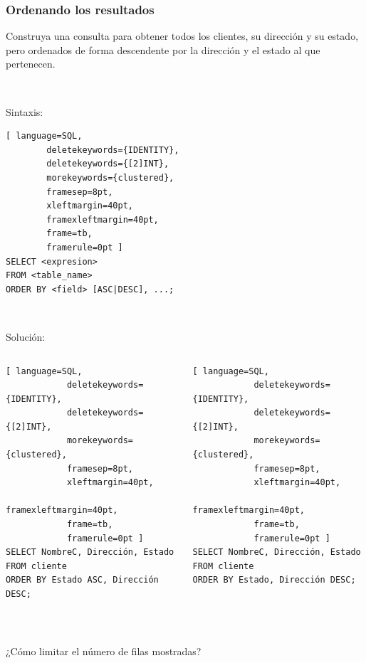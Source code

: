 \documentclass[
	10pt, %
	aspectratio=169, %
]{beamer}
\begin{document}
\begin{frame}[fragile]

	\frametitle{Ordenando los resultados}
	
	Construya una consulta para obtener todos los clientes, su dirección y su estado, pero ordenados de forma descendente por la dirección y el estado al que pertenecen.
	
	\pause
	
	\ 
	
	Sintaxis:
	\begin{lstlisting}[ language=SQL,
		deletekeywords={IDENTITY},
		deletekeywords={[2]INT},
		morekeywords={clustered},
		framesep=8pt,
		xleftmargin=40pt,
		framexleftmargin=40pt,
		frame=tb,
		framerule=0pt ]
SELECT <expresion>
FROM <table_name>
ORDER BY <field> [ASC|DESC], ...;
\end{lstlisting} 

	\pause
	
	\ 
	
	Solución:
	\begin{columns}[t]
		\begin{lstlisting}[ language=SQL,
			deletekeywords={IDENTITY},
			deletekeywords={[2]INT},
			morekeywords={clustered},
			framesep=8pt,
			xleftmargin=40pt,
			framexleftmargin=40pt,
			frame=tb,
			framerule=0pt ]
SELECT NombreC, Dirección, Estado 
FROM cliente 
ORDER BY Estado ASC, Dirección DESC;
\end{lstlisting} 
		
		\begin{lstlisting}[ language=SQL,
			deletekeywords={IDENTITY},
			deletekeywords={[2]INT},
			morekeywords={clustered},
			framesep=8pt,
			xleftmargin=40pt,
			framexleftmargin=40pt,
			frame=tb,
			framerule=0pt ]
SELECT NombreC, Dirección, Estado 
FROM cliente 
ORDER BY Estado, Dirección DESC;
\end{lstlisting} 
		
	\end{columns}
	
	\pause 
	
	\ 
	
	
	\textcolor{codepurple}{¿Cómo limitar el número de filas mostradas?}
	
\end{frame}

\end{document}
